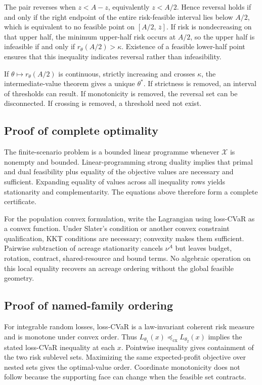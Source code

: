 \documentclass[11pt]{article}
\begin{document}
The pair reverses when \(z<A-z\), equivalently \(z<A/2\). Hence reversal holds
if and only if the right endpoint of the entire risk-feasible interval lies
below \(A/2\), which is equivalent to no feasible point on
\([A/2,\,\overline z]\). If risk is nondecreasing on that upper half, the
minimum upper-half risk occurs at \(A/2\), so the upper half is infeasible if
and only if \(r_\theta(A/2)>\kappa\). Existence of a feasible lower-half point
ensures that this inequality indicates reversal rather than infeasibility.

If \(\theta\mapsto r_\theta(A/2)\) is continuous, strictly increasing and
crosses \(\kappa\), the intermediate-value theorem gives a unique
\(\theta^*\). If strictness is removed, an interval of thresholds can result.
If monotonicity is removed, the reversal set can be disconnected. If crossing
is removed, a threshold need not exist.

\subsection{Proof of complete optimality}

The finite-scenario problem is a bounded linear programme whenever
\(\mathcal X\) is nonempty and bounded. Linear-programming strong duality
implies that primal and dual feasibility plus equality of the objective values
are necessary and sufficient. Expanding equality of values across all
inequality rows yields stationarity and complementarity. The equations above
therefore form a complete certificate.

For the population convex formulation, write the Lagrangian using loss-CVaR
as a convex function. Under Slater's condition or another convex constraint
qualification, KKT conditions are necessary; convexity makes them sufficient.
Pairwise subtraction of acreage stationarity cancels \(\nu^A\) but leaves
budget, rotation, contract, shared-resource and bound terms. No algebraic
operation on this local equality recovers an acreage ordering without the
global feasible geometry.

\subsection{Proof of named-family ordering}

For integrable random losses, loss-CVaR is a law-invariant coherent risk measure and
is monotone under convex order. Thus
\(L_{\theta_1}(x)\preceq_{\mathrm{cx}}L_{\theta_2}(x)\) implies the stated
loss-CVaR inequality at each \(x\). Pointwise inequality gives containment of the
two risk sublevel sets. Maximizing the same expected-profit objective over
nested sets gives the optimal-value order. Coordinate monotonicity does not
follow because the supporting face can change when the feasible set contracts.
\end{document}

